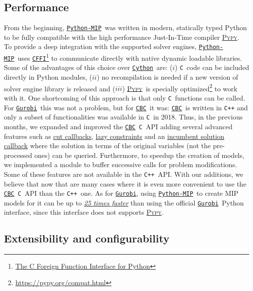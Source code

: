 \documentclass{article}
\def\C{\texttt{C}}
\def\CPP{\texttt{C++}}
\def\Pypy{\href{https://pypy.org}{\textsc{Pypy}}}
\def\Gurobi{\href{www.gurobi.com}{\texttt{Gurobi}\textsuperscript{\textregistered}}}
\def\Cython{\href{https://cython.org/}{\texttt{Cython}}}
\def\CFFI{\href{https://cffi.readthedocs.io}{\texttt{CFFI}}}
\def\CBC{\href{https://github.com/coin-or/cbc}{\texttt{CBC}}}
\def\PythonMIP{\href{https://github.com/coin-or/python-mip}{\texttt{Python-MIP}}}
\begin{document}
\subsection{Performance}
From the beginning, \PythonMIP\ was written in modern, statically typed Python to be fully compatible with the high performance Just-In-Time compiler \Pypy. To provide a deep integration with the supported solver engines, \PythonMIP\ uses \CFFI\footnote{\href{https://cffi.readthedocs.io}{The C Foreign Function Interface for Python}} to communicate directly with native dynamic loadable libraries. Some of the advantages of this choice over \Cython\ are: ($i$) \C\ code can be included directly in Python modules, ($ii$) no recompilation is needed if a new version of solver engine library is released and ($iii$) \Pypy\ is specially optimized\footnote{\href{https://pypy.org/compat.html}{https://pypy.org/compat.html}} to work with it. One shortcoming of this approach is that only \C\ functions can be called. For \Gurobi\ this was not a problem, but for \CBC\ it was: \CBC\ is written in \texttt{C++} and only a subset of functionalities was available in \C\ in 2018. Thus, in the previous months, we expanded and improved the \CBC\ \C\ API adding several advanced features such as \href{https://python-mip.readthedocs.io/en/latest/custom.html#cut-callback}{cut callbacks}, \href{https://python-mip.readthedocs.io/en/latest/custom.html#lazy-constraints}{lazy constraints} and an \href{https://python-mip.readthedocs.io/en/latest/classes.html#incumbentupdater}{incumbent solution callback} where the solution in terms of the original variables (not the pre-processed ones) can be queried. Furthermore, to speedup the creation of models, we implemented a module to buffer successive calls for problem modifications. Some of these features are not available in the \CPP\ API. With our additions, we believe that now that are many cases where it is even more convenient to use the \CBC\ \C\ API than the \CPP\ one. As for \Gurobi, using \PythonMIP\ to create MIP models for it can be up to \href{https://python-mip.readthedocs.io/en/latest/bench.html#n-queens}{ \emph{25 times faster}} than using the official \Gurobi\ Python interface, since this interface does not supports \Pypy.

\subsection{Extensibility and configurability}
\end{document}
